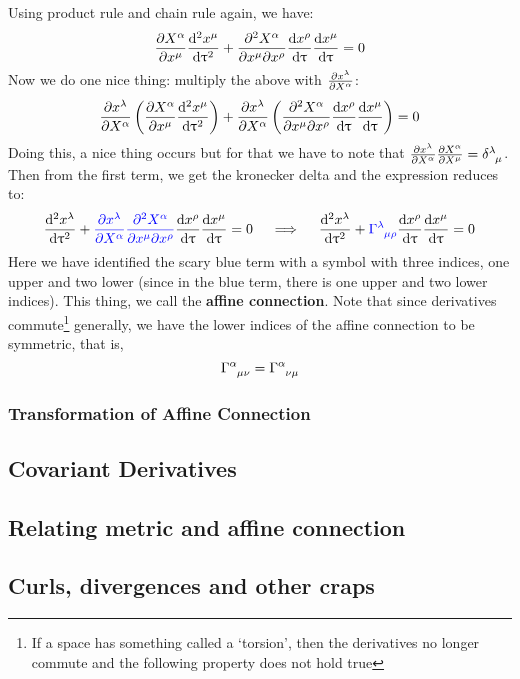 Using product rule and chain rule again, we have:
$$\pdv{X^\alpha}{x^\mu}\dv[2]{x^\mu}{\uptau} +\pdv{X^\alpha}{x^\mu}{x^\rho} \dv{x^\rho}{\uptau} \dv{x^\mu}{\uptau}=0$$
Now we do one nice thing: multiply the above with $\pdv{x^\lambda}{X^\alpha}$:
$$\pdv{x^\lambda}{X^\alpha}\left( \pdv{X^\alpha}{x^\mu}\dv[2]{x^\mu}{\uptau} \right) +\pdv{x^\lambda}{X^\alpha}\left( \pdv{X^\alpha}{x^\mu}{x^\rho} \dv{x^\rho}{\uptau} \dv{x^\mu}{\uptau} \right)=0$$
Doing this, a nice thing occurs but for that we have to note that $\pdv{x^\lambda}{X^\alpha}\pdv{X^\alpha}{X^\mu} = \tensor{\delta}{^\lambda _\mu}$. Then from the first term, we get the kronecker delta and the expression reduces to:
$$\dv[2]{x^\lambda}{\uptau} +\mathcolor{blue}{\pdv{x^\lambda}{X^\alpha}\pdv{X^\alpha}{x^\mu}{x^\rho}} \dv{x^\rho}{\uptau} \dv{x^\mu}{\uptau}=0 \quad \implies \quad \dv[2]{x^\lambda}{\uptau} +\mathcolor{blue}{\tensor{\Gamma}{^\lambda _\mu _\rho}} \dv{x^\rho}{\uptau} \dv{x^\mu}{\uptau}=0$$
Here we have identified the scary blue term with a symbol with three indices, one upper and two lower (since in the blue term, there is one upper and two lower indices). This thing, we call the \textbf{affine connection}. 
Note that since derivatives commute\footnote{If a space has something called a `torsion', then the derivatives no longer commute and the following property does not hold true} generally, we have the lower indices of the affine connection to be symmetric, that is,
$$\tensor{\Gamma}{^\alpha _\mu _\nu} =\tensor{\Gamma}{^\alpha _\nu _\mu}$$
\subsubsection{Transformation of Affine Connection}
\subsection{Covariant Derivatives}
\subsection{Relating metric and affine connection}
\subsection{Curls, divergences and other craps}